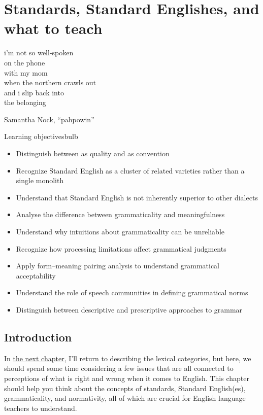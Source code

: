 \chapter{Standards, Standard Englishes, and what to teach}\label{sec:standards}\label{ch:standards}

\epigraph{i'm not so well-spoken\\
on the phone\\
with my mom\\
when the northern crawls out\\
and i slip back into\\
the belonging}{Samantha Nock, \enquote{pahpowin} \citep{Nock2019Pahpowin}}

\begin{tblsframedsymbol}{Learning objectives}{bulb}
  \begin{itemize}[noitemsep, leftmargin=*]
      \item Distinguish between  as quality and  as convention
      \item Recognize Standard English as a cluster of related varieties rather than a single monolith
      \item Understand that Standard English is not inherently superior to other dialects
      \item Analyse the difference between grammaticality and meaningfulness
      \item Understand why intuitions about grammaticality can be unreliable
      \item Recognize how processing limitations affect grammatical judgments
      \item Apply form--meaning pairing analysis to understand grammatical acceptability
      \item Understand the role of speech communities in defining grammatical norms
      \item Distinguish between descriptive and prescriptive approaches to grammar
  \end{itemize}
  \end{tblsframedsymbol}
  
\section{Introduction}
In \hyperref[ch:categories]{the next chapter}, I'll return to describing the lexical categories, but here, we should spend some time considering a few issues that are all connected to perceptions of what is right and wrong when it comes to English. This chapter should help you think about the concepts of standards, Standard English(es), grammaticality, and normativity, all of which are crucial for English language teachers to understand.

